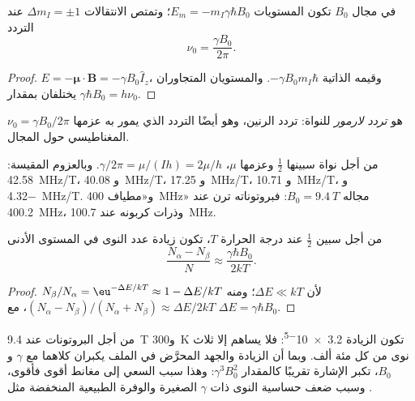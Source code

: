 \begin{proposition}\label{prop:b3:advanced-nmr:zeeman}
في مجال $B_0$ تكون المستويات $E_m = -m_I\gamma\hbar B_0$؛ وتمتص الانتقالات $\Delta m_I = \pm1$
عند التردد
\[
\nu_0 = \frac{\gamma B_0}{2\pi}.
\]
\end{proposition}

\begin{proof}
$E = -\boldsymbol\mu\cdot\mathbf B = -\gamma B_0\hat I_z$، وقيمه الذاتية $-\gamma B_0m_I\hbar$. والمستويان
المتجاوران يختلفان بمقدار $\gamma\hbar B_0 = h\nu_0$.
\end{proof}

\begin{definition}\label{def:b3:advanced-nmr:larmor}
$\nu_0 = \gamma B_0/2\pi$ هو \emph{تردد لارمور}
للنواة: تردد الرنين، وهو أيضًا التردد الذي يمور به عزمها
المغناطيسي حول المجال.
\end{definition}

\begin{example}\label{ex:b3:advanced-nmr:nuclei}
من أجل نواة سبينها $\frac12$ وعزمها $\mu$، $\gamma/2\pi = \mu/(Ih) = 2\mu/h$. وبالعزوم
المقيسة:  \qty{42.58}{MHz/T}، و \qty{40.08}{MHz/T}، و
\qty{17.25}{MHz/T}، و \qty{10.71}{MHz/T}، و \qty{-4.32}{MHz/T}. 
و«مطياف \qty{400}{MHz}» مجاله $B_0 = \qty{9.4}{T}$: فبروتوناته ترن عند
\qty{400.2}{MHz}، وذرات كربونه عند \qty{100.7}{MHz}.
\end{example}

\begin{proposition}\label{prop:b3:advanced-nmr:populations}
من أجل سبين $\frac12$ عند درجة الحرارة $T$، تكون زيادة عدد النوى في المستوى الأدنى
\[
\frac{N_\alpha - N_\beta}{N} \approx \frac{\gamma\hbar B_0}{2kT}.
\]
\end{proposition}

\begin{proof}
$N_\beta/N_\alpha = \eu^{-\Delta E/kT} \approx 1 - \Delta E/kT$ لأن $\Delta E \ll kT$؛ ومنه
$(N_\alpha - N_\beta)/(N_\alpha + N_\beta) \approx \Delta E/2kT$، مع $\Delta E = \gamma\hbar B_0$.
\end{proof}

من أجل البروتونات عند \qty{9.4}{T} و\qty{300}{K} تكون الزيادة \num{3.2e-5}: فلا
يساهم إلا ثلاث نوى من كل مئة ألف. وبما أن الزيادة 
والجهد المحرَّض في الملف يكبران كلاهما مع $\gamma$ و$B_0$، تكبر الإشارة
تقريبًا كالمقدار $\gamma^3B_0^2$: وهذا سبب السعي إلى مغانط أقوى فأقوى، وسبب ضعف
حساسية النوى ذات $\gamma$ الصغيرة والوفرة الطبيعية المنخفضة مثل
.

